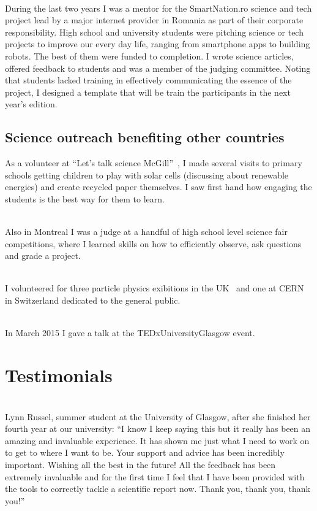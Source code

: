 \documentclass[12pt]{article} %
\begin{document}
\begin{appendices}
\ \\During the last two years I was a mentor for the SmartNation.ro science and tech project lead by a major internet provider in Romania as part of their corporate responsibility. High school and university students were pitching science or tech projects to improve our every day life, ranging from smartphone apps to building robots. The best of them were funded to completion. I wrote science articles, offered feedback to students and was a member of the judging committee. Noting that students lacked training in effectively communicating the essence of the project, I designed a template that will be train the participants in the next year's edition. 

\subsection{Science outreach benefiting other countries}

As a volunteer at ``Let's talk science McGill''~\cite{LTSMcGill}, I made several visits to primary schools getting children to play with solar cells (discussing about renewable energies) and create recycled paper themselves. I saw first hand how engaging the students is the best way for them to learn. 

\ \\Also in Montreal I was a judge at a handful of high school level science fair competitions, where I learned skills on how to efficiently observe, ask questions and grade a project. 

\ \\I volunteered for three particle physics exibitions in the UK~\cite{PP4SS} and one at CERN~\cite{CERNOpenDays2013} in Switzerland dedicated to the general public. 

\ \\In March 2015 I gave a talk at the TEDxUniversityGlasgow event. 


\section{Testimonials} \label{appendix:Testimonials} %


\ \\Lynn Russel, summer student at the University of Glasgow, after she finished her fourth year at our university: ``I know I keep saying this but it really has been an amazing and invaluable experience. It has shown me just what I need to work on to get to where I want to be. Your support and advice has been incredibly important. Wishing all the best in the future! All the feedback has been extremely invaluable and for the first time I feel that I have been provided with the tools to correctly tackle a scientific report now. Thank you, thank you, thank you!''


\end{appendices}
\end{document}
